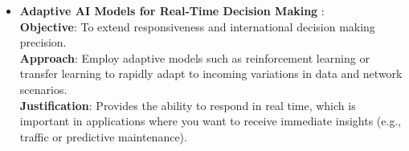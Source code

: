 \documentclass [xcolor=svgnames] {beamer}
\begin{document}
\begin{frame}[allowframebreaks]
\begin{itemize}
\item \textbf{Adaptive AI Models for Real-Time Decision Making }:\\
\textbf{Objective}: To extend responsiveness and international decision making precision.\\
\textbf{Approach}: Employ adaptive models such as reinforcement learning or transfer learning to rapidly adapt to incoming variations in data and network scenarios.\\
\textbf{Justification}: Provides the ability to respond in real time, which is important in applications where you want to receive immediate insights (e.g., traffic or predictive maintenance).
\end{itemize}

\end{frame}
\end{document}
